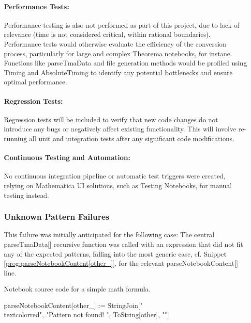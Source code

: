\paragraph{Performance Tests:}

Performance testing is also not performed as part of this project, due to lack of relevance (time is not considered critical, within rational boundaries). Performance tests would otherwise evaluate the efficiency of the conversion process, particularly for large and complex Theorema notebooks, for instane. Functions like parseTmaData and file generation methods would be profiled using Timing and AbsoluteTiming to identify any potential bottlenecks and ensure optimal performance. \cite{wolfram_research_inc_using_2024-1}

\paragraph{Regression Tests:}

Regression tests will be included to verify that new code changes do not introduce any bugs or negatively affect existing functionality. This will involve re-running all unit and integration tests after any significant code modifications.

\paragraph{Continuous Testing and Automation:}

No continuous integration pipeline or automatic test triggers were created, relying on Mathematica UI solutions, such as Testing Notebooks, for manual testing instead.

\subsubsection{Unknown Pattern Failures}

This failure was initially anticipated for the following case: The central parseTmaData[] recursive function was called with an expression that did not fit any of the expected patterns, falling into the most generic case, cf. Snippet \ref{prog:parseNotebookContent[other_]}, for the relevant parseNotebookContent[] line.

 \begin{program}
\caption{Notebook source code for a simple math formula.}
\label{prog:parseNotebookContent[other_]}
\begin{LaTeXCode}
parseNotebookContent[other_] := StringJoin["\\textcolor{red}{", "Pattern not found! ", ToString[other], "}"]
\end{LaTeXCode}
\end{program}

